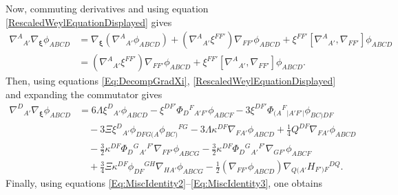 \documentclass[10pt,a4paper]{article}
\theoremstyle{plain}
\begin{document}
Now, commuting derivatives and using equation
\eqref{RescaledWeylEquationDisplayed} gives
\begin{align}
    \nabla^A{}_{A'}\nabla_{\bm\xi}\phi_{ABCD} &=
    \nabla_{\bm\xi}(\nabla^A{}_{A'}\phi_{ABCD}) +
    (\nabla^A{}_{A'}\xi^{FF'})\nabla_{FF'} \phi_{ABCD} +
    \xi^{FF'}\left[\nabla^A{}_{A'},
      \nabla_{FF'}\right]\phi_{ABCD}\nonumber\\ & =
    (\nabla^A{}_{A'}\xi^{FF'})\nabla_{FF'} \phi_{ABCD} +
    \xi^{FF'}\left[\nabla^A{}_{A'}, \nabla_{FF'}\right]\phi_{ABCD}.
\end{align}
Then, using equations \eqref{Eq:DecompGradXi},
\eqref{RescaledWeylEquationDisplayed}
and expanding the commutator gives
\begin{align*}
\nabla^D{}_{A'}\nabla_{\bm\xi}\phi_{ABCD} & = 6 \Lambda \xi^{D}{}_{A'} \phi_{ABCD} -  \xi^{DF'} \Phi_{D}{}^{F}{}_{A'F'} \phi_{ABCF} -  3\xi^{DF'} \Phi_{(A}{}^{F}{}_{\vert A'F'\vert} \phi_{BC)DF}  \nonumber\\
    &\quad -  3\Xi\xi^{D}{}_{A'}  \phi_{DFG(A} \phi_{BC)}{}^{FG} - 3\Lambda \kappa^{DF} \nabla_{FA'}\phi_{ABCD} + \tfrac{1}{4} Q^{DF} \nabla_{FA'}\phi_{ABCD}  \nonumber\\ 
    &\quad -  \tfrac{3}{2} \kappa^{DF} \Phi_{D}{}^{G}{}_{A'}{}^{F'} \nabla_{FF'}\phi_{ABCG} -  \tfrac{3}{2} \kappa^{DF} \Phi_{D}{}^{G}{}_{A'}{}^{F'} \nabla_{GF'}\phi_{ABCF} \nonumber\\
    &\quad + \tfrac{3}{4} \Xi \kappa^{DF} \phi_{DF}{}^{GH} \nabla_{HA'}\phi_{ABCG} - \tfrac{1}{2}( \nabla_{FF'}\phi_{ABCD}) \nabla_{Q(A'}H_{F')F}{}^{DQ}.
\end{align*}
Finally, using equations \eqref{Eq:MiscIdentity2}--\eqref{Eq:MiscIdentity3}, one obtains
\end{document}
